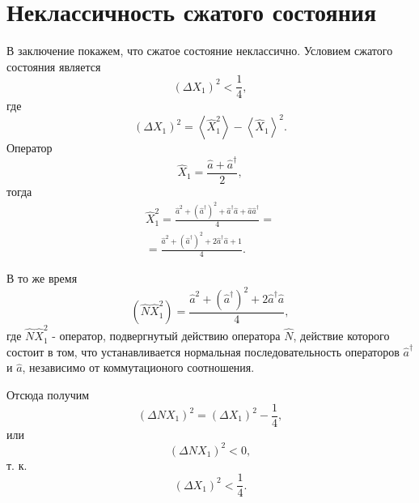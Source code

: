 \section{Неклассичность сжатого состояния}
В заключение покажем, что сжатое состояние неклассично. Условием
сжатого состояния является 
\begin{equation}
\left(\Delta X_1\right)^2 < \frac{1}{4},
\nonumber
\end{equation}
где 
\[
\left(\Delta X_1\right)^2 =
\left<\hat{X}_1^2\right> - 
\left<\hat{X}_1\right>^2.
\]
Оператор
\[
\hat{X}_1 = \frac{\hat{a} + \hat{a}^{\dag}}{2},
\]
тогда 
\begin{eqnarray}
\hat{X}_1^2 = \frac{\hat{a}^2 + \left(\hat{a}^{\dag}\right)^2 +
  \hat{a}^{\dag}\hat{a} + \hat{a} \hat{a}^{\dag}}{4} = 
\nonumber \\
=
\frac{\hat{a}^2 + \left(\hat{a}^{\dag}\right)^2 +
  2 \hat{a}^{\dag}\hat{a} + 1}{4}.
\nonumber
\end{eqnarray}

В то же время 
\[
\left(\hat{N}\hat{X}_1^2\right) = \frac{
\hat{a}^2 + \left(\hat{a}^{\dag}\right)^2 +
2 \hat{a}^{\dag}\hat{a}}{4},
\]
где $\hat{N}\hat{X}_1^2$ - оператор, подвергнутый действию оператора
$\hat{N}$, действие которого состоит в том, что устанавливается
нормальная последовательность операторов $\hat{a}^{\dag}$ и $\hat{a}$,
независимо от коммутационого соотношения.

Отсюда получим
\begin{equation}
\left(\Delta N X_1\right)^2 = 
\left(\Delta X_1\right)^2 - \frac{1}{4},
\nonumber
\end{equation}
или
\begin{equation}
\left(\Delta N X_1\right)^2 < 0,
\nonumber
\end{equation}
т. к. 
\[
\left(\Delta X_1\right)^2 < \frac{1}{4}.
\]

